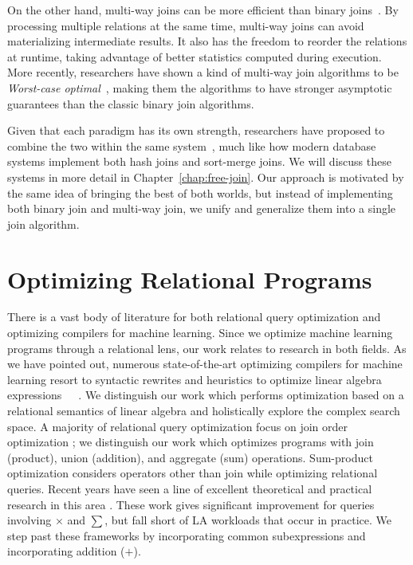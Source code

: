 On the other hand, multi-way joins can be more efficient than binary joins~\cite{DBLP:conf/vldb/GraefeBC98, DBLP:conf/vldb/KemperKW99, DBLP:conf/sigmod/HellersteinA00}.
By processing multiple relations at the same time, 
 multi-way joins can avoid materializing intermediate results. 
It also has the freedom to reorder the relations at runtime,
 taking advantage of better statistics computed during execution.
More recently, researchers have shown a kind of multi-way join algorithms to be 
 {\em Worst-case optimal}~\cite{DBLP:conf/pods/NgoPRR12, DBLP:conf/icdt/Veldhuizen14,
  DBLP:journals/sigmod/NgoRR13, DBLP:conf/pods/000118},
 making them the algorithms to have stronger asymptotic guarantees than the classic binary join algorithms.

Given that each paradigm has its own strength, 
 researchers have proposed to combine the two within the same 
 system~\cite{DBLP:journals/pvldb/FreitagBSKN20,DBLP:journals/tods/AbergerLTNOR17, DBLP:journals/pvldb/MhedhbiS19}, 
 much like how modern database systems implement both hash joins and sort-merge joins.
We will discuss these systems in more detail in Chapter~\ref{chap:free-join}.
Our approach is motivated by the same idea of bringing the best of both worlds, 
 but instead of implementing both binary join and multi-way join,
 we unify and generalize them into a single join algorithm.

\section{Optimizing Relational Programs}
\label{sec:related:linear-algebra}

There is a vast body of literature for both relational query optimization and
optimizing compilers for machine learning. Since we optimize machine learning programs through a
relational lens, our work relates to research in both fields. As we have pointed
out, numerous state-of-the-art optimizing compilers for machine learning
 resort to syntactic rewrites and heuristics to optimize linear algebra
expressions~\cite{DBLP:reference/bdt/Boehm19}~\cite{DBLP:conf/icml/SujeethLBRCWAOO11}~\cite{DBLP:conf/sigmod/HuangB013}. We distinguish our work which performs optimization based on a
relational semantics of linear algebra and holistically explore the complex
search space. A majority of relational query optimization focus on join order
optimization \cite{Graefe95a} \cite{MoerkotteN06} \cite{MoerkotteN08}
\cite{selinger1979access}; we distinguish our work which optimizes programs with
join (product), union (addition), and aggregate (sum) operations. Sum-product optimization considers operators other than join while optimizing
relational queries. Recent years have seen a line of excellent theoretical and
practical research in this area \cite{KhamisNR16} \cite{Joglekar2016AJARAA}.
These work gives significant improvement for queries involving $\times$ and $\sum$,
but fall short of LA workloads that occur in practice. We step past these
frameworks by incorporating common subexpressions and incorporating addition
($+$). 

